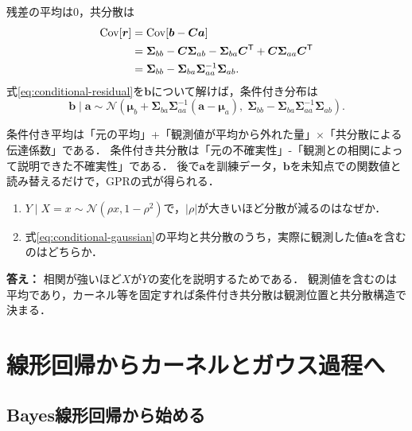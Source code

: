 \documentclass[a4paper,11pt]{ltjsarticle}
\newcommand{\N}{\mathcal N}
\newcommand{\T}{\mathsf T}
\newcommand{\Cov}{\operatorname{Cov}}
\begin{document}
残差の平均は0，共分散は
\begin{align}
  \Cov[\bm r]
  &=\Cov[\bm b-\bm C\bm a]\notag\\
  &=\bm\Sigma_{bb}
  -\bm C\bm\Sigma_{ab}
  -\bm\Sigma_{ba}\bm C^\T
  +\bm C\bm\Sigma_{aa}\bm C^\T\notag\\
  &=\bm\Sigma_{bb}
  -\bm\Sigma_{ba}\bm\Sigma_{aa}^{-1}\bm\Sigma_{ab}.
  \label{eq:conditional-residual-covariance}
\end{align}
式\eqref{eq:conditional-residual}を\(\bm b\)について解けば，条件付き分布は
\begin{equation}
  \boxed{
  \bm b\mid\bm a
  \sim\N\left(
  \bm\mu_b+
  \bm\Sigma_{ba}\bm\Sigma_{aa}^{-1}(\bm a-\bm\mu_a),
  \;
  \bm\Sigma_{bb}
  -\bm\Sigma_{ba}\bm\Sigma_{aa}^{-1}\bm\Sigma_{ab}
  \right).}
  \label{eq:conditional-gaussian}
\end{equation}

\begin{intuitionbox}[条件付き式の二つの項]
条件付き平均は「元の平均」+「観測値が平均から外れた量」\(\times\)「共分散による伝達係数」である．
条件付き共分散は「元の不確実性」-「観測との相関によって説明できた不確実性」である．
後で\(\bm a\)を訓練データ，\(\bm b\)を未知点での関数値と読み替えるだけで，GPRの式が得られる．
\end{intuitionbox}

\begin{checkpointbox}
\begin{enumerate}
  \item \(Y\mid X=x\sim\N(\rho x,1-\rho^2)\)で，\(|\rho|\)が大きいほど分散が減るのはなぜか．
  \item 式\eqref{eq:conditional-gaussian}の平均と共分散のうち，実際に観測した値\(\bm a\)を含むのはどちらか．
\end{enumerate}
\textbf{答え：} 相関が強いほど\(X\)が\(Y\)の変化を説明するためである．
観測値を含むのは平均であり，カーネル等を固定すれば条件付き共分散は観測位置と共分散構造で決まる．
\end{checkpointbox}

\section{線形回帰からカーネルとガウス過程へ}
\label{sec:kernel-gp}

\subsection{Bayes線形回帰から始める}
\end{document}
